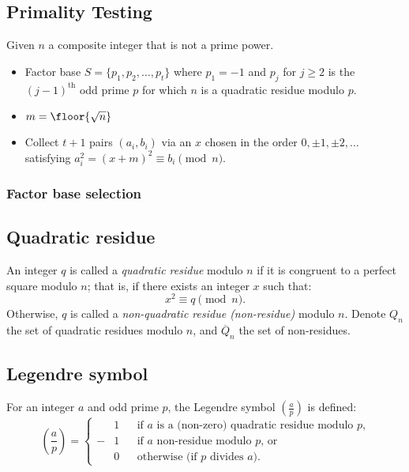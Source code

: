 \documentclass{article}
\begin{document}
\subsection{Primality Testing}

Given $n$ a composite integer that is not a prime power.

\begin{itemize}
    \item
        Factor base $S=\{p_1,p_2,\ldots,p_t\}$
        where $p_1=-1$ and $p_j$ for $j\ge 2$ is the $(j-1)^\text{th}$ odd prime
        $p$ for which $n$ is a quadratic residue modulo $p$.
    \item
        $m=\floor{\sqrt n}$
    \item
        Collect $t+1$ pairs $(a_i,b_i)$
        via an $x$ chosen in the order $0,\pm 1,\pm 2,\ldots$
        satisfying $a_i^2=(x+m)^2\equiv b_i\pmod n$.
\end{itemize}

\subsubsection{Factor base selection}

\subsection{Quadratic residue}

An integer $q$ is called a \emph{quadratic residue} modulo $n$
if it is congruent to a perfect square modulo $n$;
that is, if there exists an integer $x$ such that:
\[
    x^2 \equiv q\pmod n.
\]
Otherwise, $q$ is called a \emph{non-quadratic residue (non-residue)} modulo $n$.
Denote $Q_n$ the set of quadratic residues modulo $n$,
and $\overline Q_n$ the set of non-residues.

\subsection{Legendre symbol}

For an integer $a$ and odd prime $p$, the Legendre symbol $(\frac a p)$ is
defined:
\[
    \left(\frac a p\right)
    = \left\{\begin{aligned}
        &1 & &\text{if $a$ is a (non-zero) quadratic residue modulo $p$,} \\
        -&1 & &\text{if $a$ non-residue modulo $p$, or} \\
        &0 & &\text{otherwise (if $p$ divides $a$).}
    \end{aligned}\right.
\]
\end{document}
